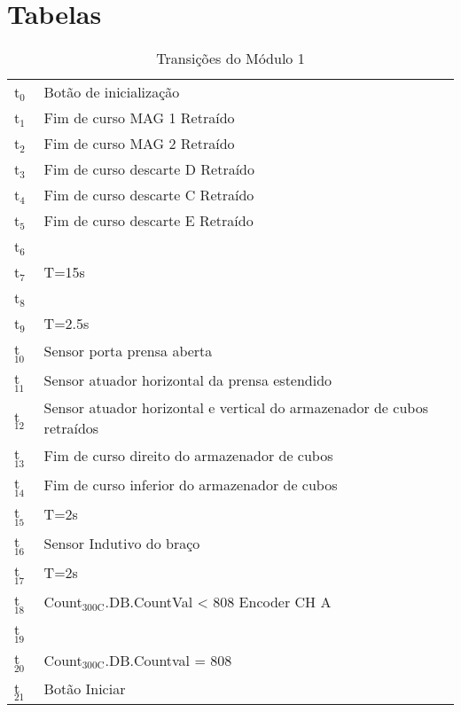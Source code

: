 \documentclass[11pt]{article}
\begin{document}
\section{Tabelas}
\label{sec-3}

\begin{table}[htb]
\caption{Transições do Módulo 1}
\centering
\begin{tabular}{ll}
t$_{\text{0}}$ & Botão de inicialização\\
t$_{\text{1}}$ & Fim de curso MAG 1 Retraído\\
t$_{\text{2}}$ & Fim de curso MAG 2 Retraído\\
t$_{\text{3}}$ & Fim de curso descarte D Retraído\\
t$_{\text{4}}$ & Fim de curso descarte C Retraído\\
t$_{\text{5}}$ & Fim de curso descarte E Retraído\\
t$_{\text{6}}$ & \\
t$_{\text{7}}$ & T=15s\\
t$_{\text{8}}$ & \\
t$_{\text{9}}$ & T=2.5s\\
t$_{\text{10}}$ & Sensor porta prensa aberta\\
t$_{\text{11}}$ & Sensor atuador horizontal da prensa estendido\\
t$_{\text{12}}$ & Sensor atuador horizontal e vertical do armazenador de cubos retraídos\\
t$_{\text{13}}$ & Fim de curso direito do armazenador de cubos\\
t$_{\text{14}}$ & Fim de curso inferior do armazenador de cubos\\
t$_{\text{15}}$ & T=2s\\
t$_{\text{16}}$ & Sensor Indutivo do braço\\
t$_{\text{17}}$ & T=2s\\
t$_{\text{18}}$ & Count$_{\text{300C}}$.DB.CountVal < 808 Encoder CH A\\
t$_{\text{19}}$ & \\
t$_{\text{20}}$ & Count$_{\text{300C}}$.DB.Countval = 808\\
t$_{\text{21}}$ & Botão Iniciar\\
\end{tabular}
\end{table}
\end{document}
